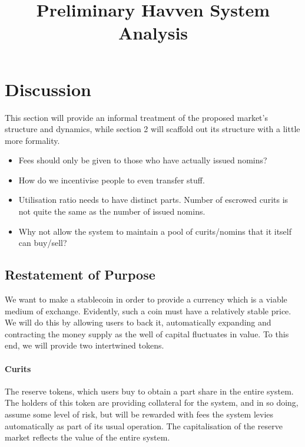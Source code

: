 \documentclass{article}
\begin{document}
\title{Preliminary Havven System Analysis}
\date{}

\begin{figure}
    \centering
    
\end{figure}
\maketitle

\section{Discussion}

This section will provide an informal treatment of the proposed market's structure
and dynamics, while section 2 will scaffold out its structure with a little more
formality.

\begin{itemize}
    \item Fees should only be given to those who have actually issued nomins?
    \item How do we incentivise people to even transfer stuff.
    \item Utilisation ratio needs to have distinct parts. Number of escrowed curits is not quite the same as the number of issued nomins.
    \item Why not allow the system to maintain a pool of curits/nomins that it itself can buy/sell?
\end{itemize}

\subsection{Restatement of Purpose}
We want to make a stablecoin in order to provide a currency which is a viable medium of exchange.
Evidently, such a coin must have a relatively stable price. We will do this by allowing users to back it,
automatically expanding and contracting the money supply as the well of capital fluctuates in value.
To this end, we will provide two intertwined tokens.
\paragraph{Curits} The reserve tokens, which users buy to obtain a part share in the entire system. The holders
of this token are providing collateral for the system, and in so doing, assume some level of risk, but will
be rewarded with fees the system levies automatically as part of its usual operation. The capitalisation
of the reserve market reflects the value of the entire system.
\end{document}
